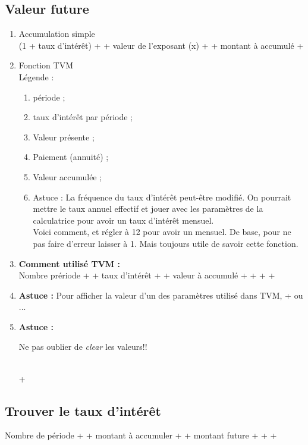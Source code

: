 \subsection{Valeur future}
\begin{enumerate}

\item Accumulation simple
\\ (1 + taux d'intérêt) +  + valeur de l'exposant (x) +  + montant à accumulé + \fbox{=}
\item Fonction TVM
\\ Légende :

\begin{enumerate}
\item {} période ;
\item {} taux d'intérêt par période ;
\item {} Valeur présente ;
\item {} Paiement (annuité) ;
\item {} Valeur accumulée ;
\item Astuce : La fréquence du taux d'intérêt peut-être modifié. On pourrait mettre le taux annuel effectif et jouer avec les paramètres de la calculatrice pour avoir un taux d'intérêt mensuel.
\\ Voici comment,  et régler à 12 pour avoir un mensuel. De base, pour ne pas faire d'erreur laisser à 1. Mais toujours utile de savoir cette fonction.
\end{enumerate}

\item \textbf{Comment utilisé TVM :}
\\ Nombre prériode +  + taux d'intérêt +  + valeur à accumulé + \fbox{+$ / $-} +  +  + 
\\ 
\item \textbf{Astuce :} Pour afficher la valeur d'un des paramètres utilisé dans TVM,  +  ou ... 
\\
\item \textbf{Astuce :}
\begin{LARGE}
Ne pas oublier de \textit{clear} les valeurs!!
\end{LARGE}
\\  + 

\end{enumerate}

\subsection{Trouver le taux d'intérêt}
Nombre de période +  + montant à accumuler +  + montant future +  +  + 

